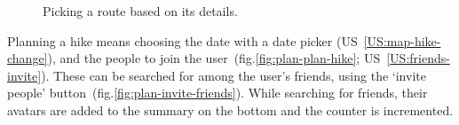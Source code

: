 \begin{figure}[h!]
    \centering
    \hfill
    \hfill
    \caption{Picking a route based on its details.}
    \label{fig:plan-pick-route}
\end{figure}

Planning a hike means choosing the date with a date picker (US~\ref{US:map-hike-change}), and the people to join the user~(fig.\ref{fig:plan-plan-hike}; US~\ref{US:friends-invite}).
These can be searched for among the user's friends, using the `invite people' button~(fig.\ref{fig:plan-invite-friends}).
While searching for friends, their avatars are added to the summary on the bottom and the counter is incremented.

